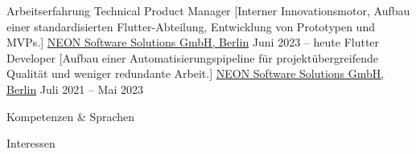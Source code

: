 \documentclass[
]{llresume}
\begin{document}
\begin{mainpane}
    \begin{mainsection}{Arbeitserfahrung}
        \entryJob
            {Technical Product Manager}
            [Interner Innovationsmotor, Aufbau einer standardisierten Flutter-Abteilung, Entwicklung von Prototypen und MVPs.]
            {\href{https://www.neon.dev/}{NEON Software Solutions GmbH, Berlin}}
            {Juni 2023 -- heute}
        \entryJob
            {Flutter Developer}
            [Aufbau einer Automatisierungspipeline für projektübergreifende Qualität und weniger redundante Arbeit.]
            {\href{https://www.neon.dev/}{NEON Software Solutions GmbH, Berlin}}
            {Juli 2021 -- Mai 2023}
    \end{mainsection}

    \begin{mainsection}{Kompetenzen \& Sprachen}
    \end{mainsection}

    \begin{mainsection}{Interessen}
    \end{mainsection}
\end{mainpane}
\end{document}
